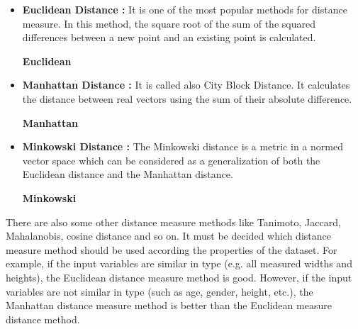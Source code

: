 \begin{itemize}

\item \textbf{Euclidean Distance : }It is one of the most popular methods for distance measure. In this method, the square root of the sum of the squared differences between a new point and an existing point is calculated.

  \begin{center}
  
\textbf{Euclidean} 

  \end{center}
  


\item \textbf{Manhattan Distance : }It is called also City Block Distance. It calculates the distance between real vectors using the sum of their absolute difference.

  \begin{center}
  
\textbf{Manhattan} 

  \end{center}
  

\item \textbf{Minkowski Distance : }The Minkowski distance is a metric in a normed vector space which can be considered as a generalization of both the Euclidean distance and the Manhattan distance.
  
  \begin{center}
  
\textbf{Minkowski} 

  \end{center}

\end{itemize}

There are also some other distance measure methods like Tanimoto, Jaccard, Mahalanobis, cosine distance and so on. It must be decided which distance measure method should be used according the properties of the dataset. For example, if the input variables are similar in type (e.g. all measured widths and heights), the Euclidean distance measure method is good. However, if the input variables are not similar in type (such as age, gender, height, etc.), the Manhattan distance measure method is better than the Euclidean measure distance method.



